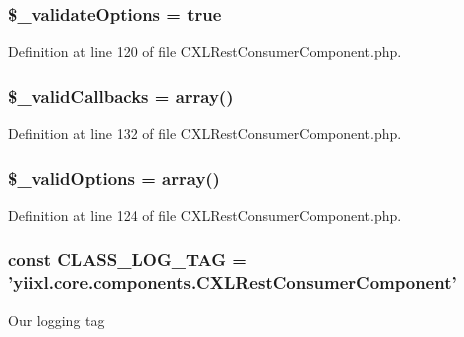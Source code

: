 \hypertarget{classCXLRestConsumerComponent_a06b741ce121a93d6010e3c514edba22b}{
\subsubsection[{\$\_\-validateOptions}]{\setlength{\rightskip}{0pt plus 5cm}\$\_\-validateOptions = true}}
\label{classCXLRestConsumerComponent_a06b741ce121a93d6010e3c514edba22b}


Definition at line 120 of file CXLRestConsumerComponent.php.

\hypertarget{classCXLRestConsumerComponent_aadd5e6fdc7ba1ec3b3e4a916c4f005d0}{
\subsubsection[{\$\_\-validCallbacks}]{\setlength{\rightskip}{0pt plus 5cm}\$\_\-validCallbacks = array()}}
\label{classCXLRestConsumerComponent_aadd5e6fdc7ba1ec3b3e4a916c4f005d0}


Definition at line 132 of file CXLRestConsumerComponent.php.

\hypertarget{classCXLRestConsumerComponent_afe1adfd2c4c57954ea5230cae01d1c47}{
\subsubsection[{\$\_\-validOptions}]{\setlength{\rightskip}{0pt plus 5cm}\$\_\-validOptions = array()}}
\label{classCXLRestConsumerComponent_afe1adfd2c4c57954ea5230cae01d1c47}


Definition at line 124 of file CXLRestConsumerComponent.php.

\hypertarget{classCXLRestConsumerComponent_aa607ab5e557e6ebb60b85c5a20ad067f}{
\subsubsection[{CLASS\_\-LOG\_\-TAG}]{\setlength{\rightskip}{0pt plus 5cm}const {\bf CLASS\_\-LOG\_\-TAG} = 'yiixl.core.components.CXLRestConsumerComponent'}}
\label{classCXLRestConsumerComponent_aa607ab5e557e6ebb60b85c5a20ad067f}
Our logging tag 

